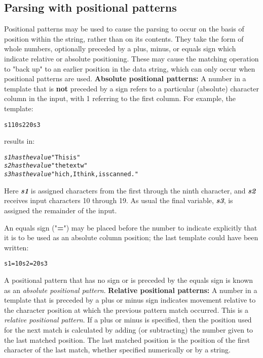 \subsection{Parsing with positional patterns}
 Positional patterns may be used to cause the parsing to occur on the
basis of position within the string, rather than on its contents.
They take the form of whole numbers, optionally preceded by a plus,
minus, or equals sign which indicate relative or absolute positioning.
These may cause the matching operation to "back up" to an earlier
position in the data string, which can only occur when positional
patterns are used.
 \textbf{Absolute positional patterns:}
A number in a template that is \textbf{not} preceded by a sign
refers to a particular (absolute)
character column in the input, with 1 referring to the first
column.
For example, the template:
\begin{alltt}
s1 10 s2 20 s3
\end{alltt}
results in:
\begin{alltt}
\emph{s1} \emph{has the value} "This is  "
\emph{s2} \emph{has the value} "the text w"
\emph{s3} \emph{has the value} "hich, I think,  is scanned."
\end{alltt}
 Here \textbf{\emph{s1}} is assigned characters from the first
through the ninth character, and \textbf{\emph{s2}} receives input
characters 10 through 19.
As usual the final variable, \textbf{\emph{s3}}, is assigned the
remainder of the input.
 
An equals sign ("\textbf{=}") may be placed before the number
to indicate explicitly that it is to be used as an absolute column
position; the last template could have been written:
\begin{alltt}
s1 =10 s2 =20 s3
\end{alltt}
 A positional pattern that has no sign or is preceded by the
equals sign is known as an \emph{absolute positional pattern}.
 \textbf{Relative positional patterns:}
A number in a template that is preceded by a plus or minus sign
indicates
movement relative to the character position at which the previous
pattern match occurred.
This is a \emph{relative positional pattern}.
 If a plus or minus
is specified, then the position used for the next
match is calculated by adding (or subtracting) the number given to the
last matched position.
The last matched position is the position of the first character of the
last match, whether specified numerically or by a string.
 

